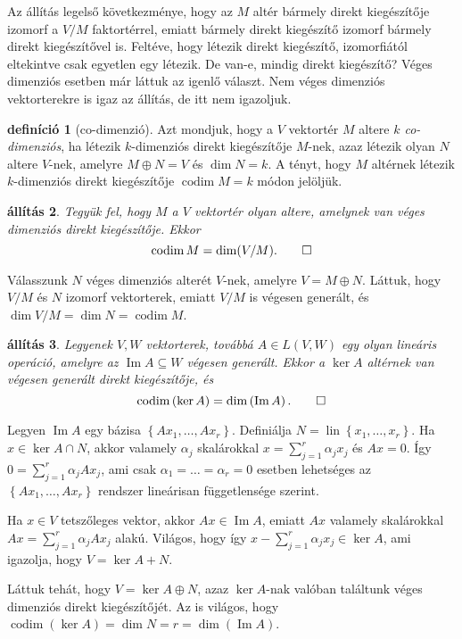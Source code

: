 \documentclass[9pt, a4paper, showtrims]{memoir}
\makeatletter
\renewenvironment{proof}[1][\proofname]
    {\par\pushQED{\qed}%
    \normalfont \topsep6\p@\@plus6\p@\relax
    \trivlist
    \item[\hskip\labelsep
        \itshape
    #1\@addpunct{:}]\ignorespaces}
    {\popQED\endtrivlist\@endpefalse}
\theoremstyle{plain}
\newtheorem{proposition}{állítás}[chapter]
\theoremstyle{remark}
\theoremstyle{definition}
\newtheorem{definition}[proposition]{definíció}
\DeclareMathOperator{\lin}{lin}
\DeclareMathOperator{\codim}{codim}
\DeclareMathOperator{\im}{Im}
\makeatother
\begin{document}
Az állítás legelső következménye, 
hogy az $M$ altér bármely direkt kiegészítője izomorf a $V/M$ faktortérrel,
emiatt bármely direkt kiegészítő izomorf bármely direkt kiegészítővel is.
Feltéve, hogy 
létezik direkt kiegészítő, izomorfiától eltekintve csak egyetlen egy létezik.
De van-e, mindig direkt kiegészítő? 
Véges dimenziós esetben már láttuk az igenlő választ.
Nem véges dimenziós vektorterekre is igaz az állítás, de itt nem igazoljuk.
\begin{definition}[co-dimenzió]
    Azt mondjuk, hogy a $V$ vektortér $M$ altere \emph{$k$ co-dimenziós},
    ha létezik $k$-dimenziós direkt kiegészítője $M$-nek,
    azaz létezik olyan $N$ altere $V$-nek, amelyre $M\oplus N=V$
    és $\dim N=k$.
    A tényt,
    hogy $M$ altérnek létezik $k$-dimenziós direkt kiegészítője
    $\codim M=k$ módon jelöljük.
\end{definition}
\begin{proposition}
    Tegyük fel, hogy $M$ a $V$ vektortér olyan altere,
    amelynek van véges dimenziós direkt kiegészítője.
    Ekkor
    \[
        \codim M=\dim(V/M).\qedhere
    \]
\end{proposition}
\begin{proof}
    Válasszunk $N$ véges dimenziós alterét $V$-nek, 
    amelyre $V=M\oplus N$.
    Láttuk, hogy $V/M$ és $N$ izomorf vektorterek,
    emiatt $V/M$ is végesen generált, és
    $\dim V/M=\dim N=\codim M$.
\end{proof}
\begin{proposition}
    Legyenek $V,W$ vektorterek,
    továbbá $A\in L\left( V,W \right)$ egy olyan lineáris operáció,
    amelyre az $\im A\subseteq W$ végesen generált.
    Ekkor a $\ker A$ altérnek van végesen generált direkt kiegészítője, és
    \[
        \codim\left( \ker A \right)=\dim\left( \im A \right).\qedhere
    \]
\end{proposition}
    \begin{proof}
        Legyen $\im A$ egy bázisa $\left\{ Ax_1,\dots,Ax_r \right\}$.
        Definiálja $N=\lin\left\{ x_1,\dots,x_r \right\}$.
        Ha $x\in\ker A\cap N$, akkor valamely $\alpha_j$ skalárokkal
        $x=\sum_{j=1}^r\alpha_jx_j$ és $Ax=0$.
        Így $0=\sum_{j=1}^r\alpha_jAx_j$, ami csak $\alpha_1=\dots=\alpha_r=0$
        esetben lehetséges az $\left\{ Ax_1,\dots,Ax_r \right\}$ rendszer lineárisan függetlensége szerint.

        Ha $x\in V$ tetszőleges vektor, akkor $Ax\in\im A$, emiatt
        $Ax$ valamely skalárokkal $Ax=\sum_{j=1}^r\alpha_jAx_j$ alakú.
        Világos, hogy így $x-\sum_{j=1}^r\alpha_jx_j\in\ker A$,
        ami igazolja, hogy $V=\ker A+N$.

        Láttuk tehát, hogy $V=\ker A\oplus N$, azaz $\ker A$-nak valóban találtunk véges dimenziós direkt kiegészítőjét.
        Az is világos, hogy $\codim\left( \ker A \right)=\dim N=r=\dim\left( \im A \right)$.
    \end{proof}
\end{document}
